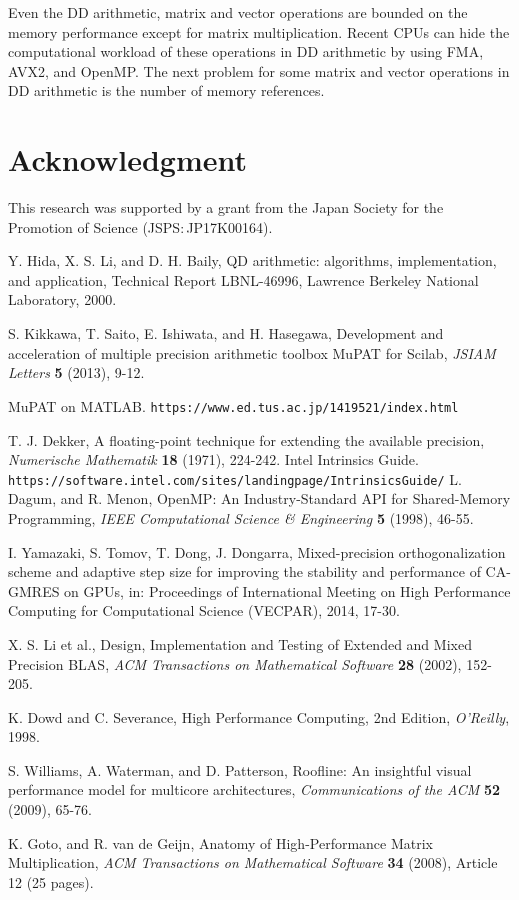 \documentclass{IOS-Book-Article}
\begin{document}
Even the DD arithmetic, matrix and vector operations are bounded on the memory performance except for matrix multiplication. Recent CPUs can hide the computational workload of these operations in DD arithmetic by using FMA, AVX2, and OpenMP. The next problem for some matrix and vector operations in DD arithmetic is the number of memory references. 

\section*{Acknowledgment}

This research was supported by a grant from the Japan Society for the Promotion of Science (JSPS$\colon$JP17K00164).
\begin{thebibliography}{99}
 Y. Hida, X. S. Li, and D. H. Baily, QD arithmetic: algorithms, implementation, and application, Technical Report LBNL-46996, Lawrence Berkeley National Laboratory, 2000.

 S. Kikkawa, T. Saito, E. Ishiwata, and H. Hasegawa, Development and acceleration of multiple precision arithmetic toolbox MuPAT for Scilab, {\it JSIAM Letters} {\bf 5} (2013), 9-12. 

 MuPAT on MATLAB. {\tt https://www.ed.tus.ac.jp/1419521/index.html}

 T. J. Dekker, A floating-point technique for extending the available precision, {\it Numerische Mathematik} {\bf 18} (1971), 224-242. 
 Intel Intrinsics Guide. {\tt https://software.intel.com/sites/landingpage/IntrinsicsGuide/}
 L. Dagum, and R. Menon, OpenMP: An Industry-Standard API for Shared-Memory Programming, {\it IEEE Computational Science \& Engineering} {\bf 5} (1998), 46-55. 

I. Yamazaki, S. Tomov, T. Dong, J. Dongarra, Mixed-precision orthogonalization scheme and adaptive step size for improving the stability and performance of CA-GMRES on GPUs, in: Proceedings of International Meeting on High Performance Computing for Computational Science (VECPAR), 2014, 17-30.

 X. S. Li et al., Design, Implementation and Testing of Extended and Mixed Precision BLAS, {\it ACM Transactions on Mathematical Software} {\bf 28} (2002), 152-205.

 K. Dowd and C. Severance, High Performance Computing, 2nd Edition, {\it O'Reilly}, 1998.

 S. Williams, A. Waterman, and D. Patterson, Roofline: An insightful visual performance model for multicore architectures, {\it Communications of the ACM} {\bf 52} (2009),  65-76.

 K. Goto, and R. van de Geijn, Anatomy of High-Performance Matrix Multiplication, {\it ACM Transactions on Mathematical Software} {\bf 34} (2008), Article 12 (25 pages).

\end{thebibliography}
\end{document}
